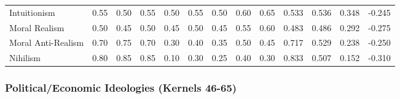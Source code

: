 \documentclass[11pt,a4paper]{article}
\theoremstyle{definition}
\theoremstyle{remark}
\begin{document}
\begin{table}[H]
\begin{tabular}{@{}l|ccccccc|c|cccc@{}}
Intuitionism & 0.55 & 0.50 & 0.55 & 0.50 & 0.55 & 0.50 & 0.60 & 0.65 & 0.533 & 0.536 & 0.348 & -0.245 \\
Moral Realism & 0.50 & 0.45 & 0.50 & 0.45 & 0.50 & 0.45 & 0.55 & 0.60 & 0.483 & 0.486 & 0.292 & -0.275 \\
Moral Anti-Realism & 0.70 & 0.75 & 0.70 & 0.30 & 0.40 & 0.35 & 0.50 & 0.45 & 0.717 & 0.529 & 0.238 & -0.250 \\
Nihilism & 0.80 & 0.85 & 0.85 & 0.10 & 0.30 & 0.25 & 0.40 & 0.30 & 0.833 & 0.507 & 0.152 & -0.310 \\
\bottomrule
\end{tabular}
\end{table}

\subsubsection{Political/Economic Ideologies (Kernels 46-65)}
\end{document}
